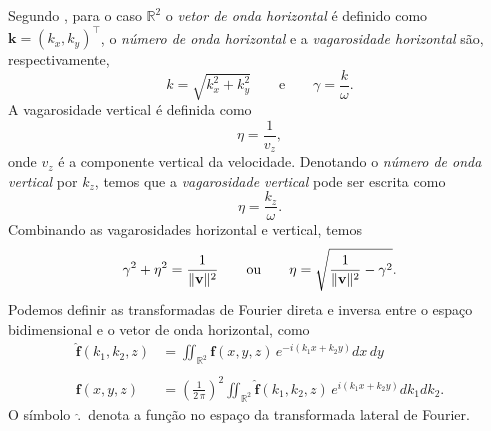 Segundo \cite{White_Zhou_2006}, para o caso $\mathbb{R}^2$ o \textit{vetor de onda horizontal} \'e definido como $\mathbf{k}=(k_x,k_y)^\top$, o \textit{n\'umero de onda horizontal} e a \textit{vagarosidade horizontal} s\~ao, respectivamente,
\begin{equation}
k=\sqrt{k_x^2+k_y^2}\qquad\text{e}\qquad\gamma=\frac{k}{\omega}.
\end{equation}
A vagarosidade vertical \'e definida como
\begin{equation}
\eta=\frac{1}{v_z},
\end{equation}
onde $v_z$ \'e a componente vertical da velocidade. Denotando o \textit{n\'umero de onda vertical} por $k_z$, temos que a \textit{vagarosidade vertical} pode ser escrita como
\begin{equation}
\eta=\frac{k_z}{\omega}.
\end{equation}
Combinando as vagarosidades horizontal e vertical, temos
\begin{equation}
\gamma^2+\eta^2=\frac{1}{\lVert\mathbf{v}\rVert^2}\qquad\text{ou}\qquad\eta=\sqrt{\frac{1}{\lVert\mathbf{v}\rVert^2}-\gamma^2}.
\end{equation}
Podemos definir as transformadas de Fourier direta e inversa entre o espa\c{c}o bidimensional e o vetor de onda horizontal, como
\begin{align*}
\mathbf{\widehat{f}}(k_1,k_2,z) &= \iint_{\mathbb{R}^2}\mathbf{f}(x,y,z)\,e^{-i(k_1x+k_2y)}dx\,dy\\\\
\mathbf{f}(x,y,z) &= \left(\frac{1}{2\,\pi}\right)^2\iint_{\mathbb{R}^2}\mathbf{\widehat{f}}(k_1,k_2,z)\,e^{i(k_1x+k_2y)}dk_1dk_2.
\end{align*}
O s\'imbolo $\,\widehat{.}\,$ denota a fun\c{c}\~ao no espa\c{c}o da transformada lateral de Fourier.
